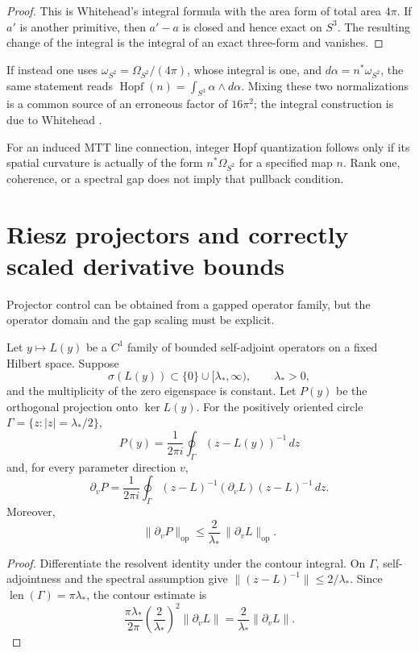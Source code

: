 \documentclass[11pt]{article}
\begin{document}
\begin{proof}
This is Whitehead's integral formula with the area form of total area
\(4\pi\).  If \(a'\) is another primitive, then \(a'-a\) is closed and hence
exact on \(S^3\).  The resulting change of the integral is the integral of an
exact three-form and vanishes.
\end{proof}

\par\medskip
If instead one uses \(\omega_{S^2}=\Omega_{S^2}/(4\pi)\), whose integral is
one, and \(d\alpha=n^*\omega_{S^2}\), the same statement reads
\(\operatorname{Hopf}(n)=\int_{S^3}\alpha\wedge d\alpha\).  Mixing these two
normalizations is a common source of an erroneous factor of \(16\pi^2\);
the integral construction is due to Whitehead \cite{whitehead1947}.

For an induced MTT line connection, integer Hopf quantization follows only if
its spatial curvature is actually of the form \(n^*\Omega_{S^2}\) for a
specified map \(n\).  Rank one, coherence, or a spectral gap does not imply
that pullback condition.

\section{Riesz projectors and correctly scaled derivative bounds}
\label{sec:riesz}

Projector control can be obtained from a gapped operator family, but the
operator domain and the gap scaling must be explicit.

\begin{theorem}\label{thm:riesz}
Let \(y\mapsto L(y)\) be a \(C^1\) family of bounded self-adjoint operators on
a fixed Hilbert space.  Suppose
\[
\sigma(L(y))\subset\{0\}\cup[\lambda_*,\infty),
\qquad \lambda_*>0,
\]
and the multiplicity of the zero eigenspace is constant.  Let \(P(y)\) be the
orthogonal projection onto \(\ker L(y)\).  For the positively oriented circle
\(\Gamma=\{z:|z|=\lambda_*/2\}\),
\[
P(y)=\frac{1}{2\pi i}\oint_\Gamma (z-L(y))^{-1}\,dz
\]
and, for every parameter direction \(v\),
\[
\partial_vP
=\frac{1}{2\pi i}\oint_\Gamma
(z-L)^{-1}(\partial_vL)(z-L)^{-1}\,dz.
\]
Moreover,
\begin{equation}
\|\partial_vP\|_{\mathrm{op}}
\le \frac{2}{\lambda_*}\,
\|\partial_vL\|_{\mathrm{op}}.
\label{eq:riesz-bound}
\end{equation}
\end{theorem}

\begin{proof}
Differentiate the resolvent identity under the contour integral.  On
\(\Gamma\), self-adjointness and the spectral assumption give
\(\|(z-L)^{-1}\|\le2/\lambda_*\).  Since
\(\operatorname{len}(\Gamma)=\pi\lambda_*\), the contour estimate is
\[
\frac{\pi\lambda_*}{2\pi}
\left(\frac{2}{\lambda_*}\right)^2
\|\partial_vL\|
=\frac{2}{\lambda_*}\|\partial_vL\|.
\]
\end{proof}
\end{document}
